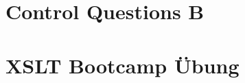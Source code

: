 \documentclass[11pt,DIV=15]{scrreprt}
\begin{document}
\section{Control Questions B}











\section{XSLT Bootcamp Übung}









%


\end{document}
